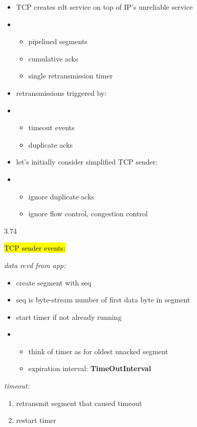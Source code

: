 \documentclass[
]{article}
\begin{document}
\begin{itemize}
\item
  TCP creates rdt service on top of IP's unreliable service
\item
  \begin{itemize}
  \item
    pipelined segments
  \item
    cumulative acks
  \item
    single retransmission timer
  \end{itemize}
\item
  retransmissions triggered by:
\item
  \begin{itemize}
  \item
    timeout events
  \item
    duplicate acks
  \end{itemize}
\item
  let's initially consider simplified TCP sender:
\item
  \begin{itemize}
  \item
    ignore duplicate acks
  \item
    ignore flow control, congestion control
  \end{itemize}
\end{itemize}

3.74

\hl{TCP sender events:}

\emph{data rcvd from app:}

\begin{itemize}
\item
  create segment with seq
\item
  seq is byte-stream number of first data byte in segment
\item
  start timer if not already running
\item
  \begin{itemize}
  \item
    think of timer as for oldest unacked segment
  \item
    expiration interval: \textbf{TimeOutInterval}
  \end{itemize}
\end{itemize}

\emph{timeout:}

\begin{enumerate}
\def\labelenumi{\arabic{enumi}.}
\item
  retransmit segment that caused timeout
\item
  restart timer
\end{enumerate}
\end{document}
